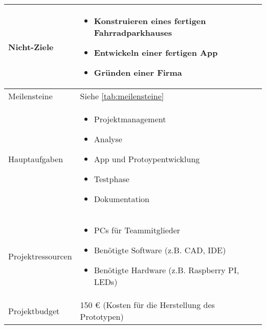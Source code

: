\begin{longtable}{p{}|p{}}
  Nicht-Ziele           &
  \begin{itemize}
    \item Konstruieren eines fertigen Fahrradparkhauses
    \item Entwickeln einer fertigen App
    \item Gründen einer Firma
  \end{itemize}                                                                     \\  \midrule

  Meilensteine          & Siehe \nameref{tab:meilensteine} \ref{tab:meilensteine}                                        \\ \midrule

  Hauptaufgaben         &
  \begin{itemize}
    \item Projektmanagement
    \item Analyse
    \item App und Protoypentwicklung
    \item Testphase
    \item Dokumentation
  \end{itemize}                                                                                        \\  \midrule

  Projektressourcen     &
  \begin{itemize}
    \item PCs für Teammitglieder
    \item Benötigte Software (z.B. \ac{CAD}, \ac{IDE})
    \item Benötigte Hardware (z.B. Raspberry PI, LEDs)
  \end{itemize}                                                                      \\  \midrule

  Projektbudget         & 150 \euro{} (Kosten für die Herstellung des Prototypen)                                        \\ \midrule


\end{longtable}
